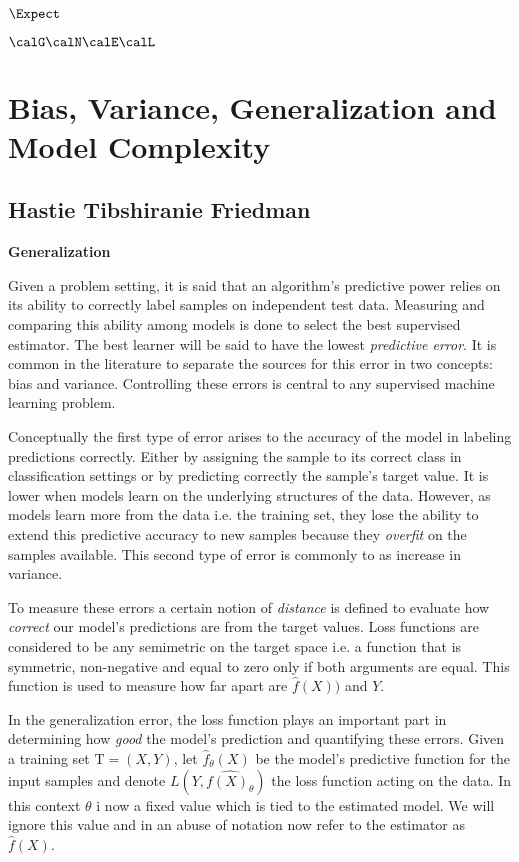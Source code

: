 
$\Expect$

$\calG \calN \calE \calL$

\section{Bias, Variance, Generalization and Model Complexity}
 
 
 \subsection{Hastie Tibshiranie Friedman}
 
 \textbf{Generalization}
 
 Given a problem setting, it is said that an algorithm's predictive power relies on its ability to correctly label samples on independent test data. Measuring and comparing this ability among models is done to select the best supervised estimator.  The best learner will be said to have the lowest \textit{predictive error}. It is common in the literature \cite{james-biasVarianceGeneral} to separate the sources for this error in two concepts: bias and variance. Controlling these errors is central to any supervised machine learning problem.

Conceptually the first type of error arises to the accuracy of the model in labeling predictions correctly. Either by assigning the sample to its correct class in classification settings or by predicting correctly the sample's target value. It is lower when models learn on the underlying structures of the data. However, as models learn more from the data i.e. the training set, they lose the ability to extend this predictive accuracy to new samples because they \textit{overfit} on the samples available. This second type of error is commonly to as increase in variance.

To measure these errors a certain notion of \textit{distance} is defined to evaluate how \textit{correct} our model's predictions are from the target values. Loss functions are considered to be any semimetric on the target space i.e. a function that is symmetric, non-negative and equal to zero only if both arguments are equal. This function is used to measure how far apart are $\hat{f}(X))$ and $Y$.
 
 In the generalization error, the loss function plays an important part in determining how \textit{good} the model's prediction and quantifying these errors. Given a training set $\mathrm{T} = (X,Y)$, let $\hat{f}_{\theta}(X)$ be the model's predictive function for the input samples and denote $L( Y,\hat{f(X)_{\theta}} )$ the loss function acting on the data. In this context $\theta$ i now a fixed value which is tied to the estimated model.  We will ignore this value and in an abuse of notation now refer to the estimator as $\hat{f}(X)$.
 

